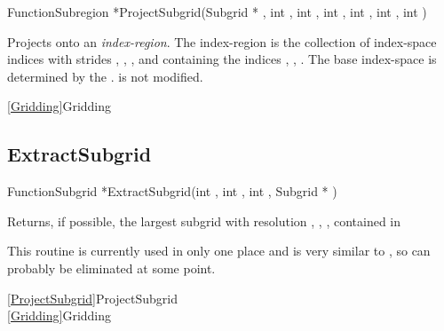 
\begin{deftypefn}{Function}{Subregion *}{ProjectSubgrid}({Subgrid *} , int , int , int , int , int , int )

\DESCRIPTION
Projects  onto an {\em index-region}.
The index-region is the collection of index-space indices with
strides , , , and containing
the indices , , .
The base index-space is determined by the .
 is not modified.

\SEEALSO
\vref{Gridding}{Gridding}

\end{deftypefn}


\newpage
\subsection{ExtractSubgrid}
\label{ExtractSubgrid}


\begin{deftypefn}{Function}{Subgrid *}{ExtractSubgrid}(int , int , int , {Subgrid *} )

\DESCRIPTION
Returns, if possible, the largest subgrid with resolution
, , ,
contained in 

\NOTES
This routine is currently used in only one place and is very similar
to , so can probably be eliminated at some point.

\SEEALSO
\vref{ProjectSubgrid}{ProjectSubgrid}\\
\vref{Gridding}{Gridding}

\end{deftypefn}


